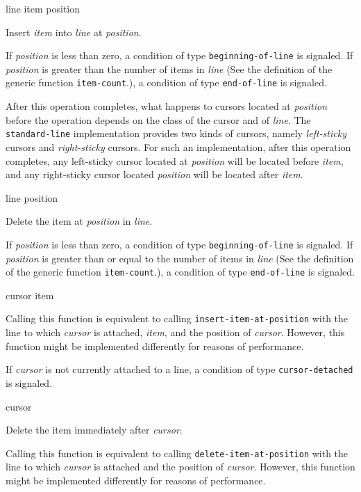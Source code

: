  {line item position}

Insert \textit{item} into \textit{line} at \textit{position}.

If \textit{position} is less than zero, a condition of type
\texttt{beginning-of-line} is signaled.  If \textit{position} is
greater than the number of items in \textit{line} (See the definition
of the generic function \texttt{item-count}.), a condition of type
\texttt{end-of-line} is signaled.

After this operation completes, what happens to cursors located at
\textit{position} before the operation depends on the class of the
cursor and of \textit{line}.  The \texttt{standard-line}
implementation provides two kinds of cursors, namely
\emph{left-sticky} cursors and \emph{right-sticky} cursors.  For such
an implementation, after this operation completes, any left-sticky
cursor located at \textit{position} will be located before
\textit{item}, and any right-sticky cursor located \textit{position}
will be located after \textit{item}.

 {line position}

Delete the item at \textit{position} in \textit{line}.

If \textit{position} is less than zero, a condition of type
\texttt{beginning-of-line} is signaled.  If \textit{position} is
greater than or equal to the number of items in \textit{line} (See the
definition of the generic function \texttt{item-count}.), a condition
of type \texttt{end-of-line} is signaled.

 {cursor item}

Calling this function is equivalent to calling
\texttt{insert-item-at-position} with the line to which
\textit{cursor} is attached, \textit{item}, and the position of
\textit{cursor}.  However, this function might be implemented
differently for reasons of performance.

If \textit{cursor} is not currently attached to a line, a condition
of type \texttt{cursor-detached} is signaled.

 {cursor}

Delete the item immediately after \emph{cursor}.

Calling this function is equivalent to calling
\texttt{delete-item-at-position} with the line to which
\textit{cursor} is attached and the position of \textit{cursor}.
However, this function might be implemented differently for reasons of
performance.

